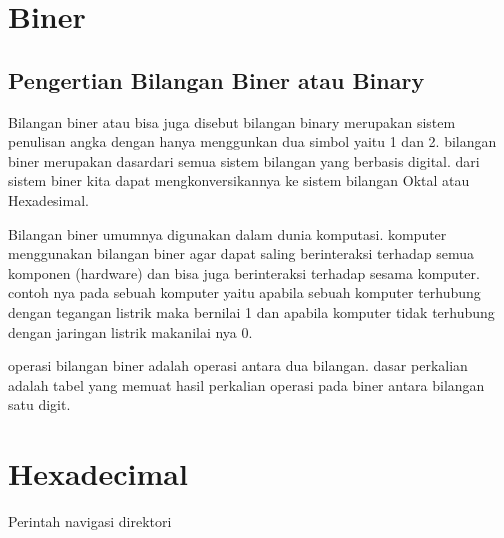 \section{Biner}
\subsection{Pengertian Bilangan Biner atau Binary}
Bilangan biner atau bisa juga disebut bilangan binary merupakan sistem penulisan angka dengan hanya menggunkan dua simbol
yaitu 1 dan 2. bilangan biner merupakan dasardari semua sistem bilangan yang berbasis digital. dari sistem biner kita dapat
mengkonversikannya ke sistem bilangan Oktal atau Hexadesimal.

Bilangan biner umumnya digunakan dalam dunia komputasi. komputer menggunakan bilangan biner agar dapat saling berinteraksi
terhadap semua komponen (hardware) dan bisa juga berinteraksi terhadap sesama komputer. contoh nya pada sebuah komputer yaitu
apabila sebuah komputer terhubung dengan tegangan listrik maka bernilai 1 dan apabila komputer tidak terhubung dengan jaringan
listrik makanilai nya 0.

operasi bilangan biner  adalah operasi antara dua bilangan. dasar perkalian adalah tabel yang memuat hasil perkalian operasi
pada biner antara bilangan satu digit.

\section{Hexadecimal}
Perintah navigasi direktori 